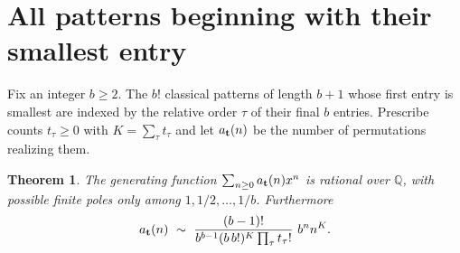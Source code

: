 \documentclass[11pt,letterpaper]{article}
\newtheorem{theorem}{Theorem}
\begin{document}
\section{All patterns beginning with their smallest entry}
Fix an integer $b\ge2$. The $b!$ classical patterns of length $b+1$ whose first entry is smallest are indexed by the relative order $\tau$ of their final $b$ entries. Prescribe counts $t_\tau\ge0$ with $K=\sum_\tau t_\tau$ and let $a_{\bf t}(n)$ be the number of permutations realizing them.
\begin{theorem}\label{arbitrary}
The generating function $\sum_{n\ge0}a_{\bf t}(n)x^n$ is rational over $\mathbb Q$, with possible finite poles only among $1,1/2,\ldots,1/b$. Furthermore
\[
 a_{\bf t}(n)\ \sim\
 \frac{(b-1)!}{b^{b-1}(b\,b!)^{K}\prod_\tau t_\tau!}\ b^n n^K.
\]
\end{theorem}
\end{document}
